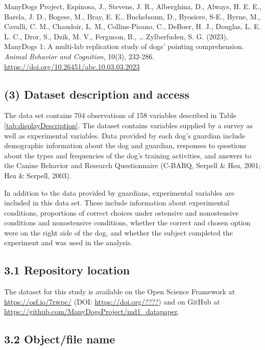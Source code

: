 \documentclass[
  man,floatsintext]{apa6}
\begin{document}
ManyDogs Project, Espinosa, J., Stevens, J. R., Alberghina, D., Always, H. E. E., Barela, J. D., Bogese, M., Bray, E. E., Buchsbaum, D., Byosiere, S-E., Byrne, M., Cavalli, C. M., Chaudoir, L. M., Collins-Pisano, C., DeBoer, H. J., Douglas, L. E. L. C., Dror, S., Dzik, M. V., Ferguson, B., \ldots{} Zylberfuden, S. G. (2023). ManyDogs 1: A multi-lab replication study of dogs' pointing comprehension. \emph{Animal Behavior and Cognition}, 10(3), 232-286.
\url{https://doi.org/10.26451/abc.10.03.03.2023}

\hypertarget{dataset-description-and-access}{%
\subsection{(3) Dataset description and access}\label{dataset-description-and-access}}

The data set contains 704 observations of 158 variables described in Table \ref{tab:displayDescription}. The dataset contains variables supplied by a survey as well as experimental variables. Data provided by each dog's guardian include demographic information about the dog and guardian, responses to questions about the types and frequencies of the dog's training activities, and answers to the Canine Behavior and Research Questionnaire (C-BARQ, Serpell \& Hsu, 2001; Hsu \& Serpell, 2003).

In addition to the data provided by guardians, experimental variables are included in this data set. These include information about experimental conditions, proportions of correct choices under ostensive and nonostensive conditions and nonostensive conditions, whether the correct and chosen option were on the right side of the dog, and whether the subject completed the experiment and was used in the analysis.

\hypertarget{repository-location}{%
\subsection{3.1 Repository location}\label{repository-location}}

The dataset for this study is available on the Open Science Framework at \url{https://osf.io/7rwpc/} (DOI: \url{https://doi.org/????}) and on GitHub at \url{https://github.com/ManyDogsProject/md1_datapaper}.

\hypertarget{objectfile-name}{%
\subsection{3.2 Object/file name}\label{objectfile-name}}
\end{document}
